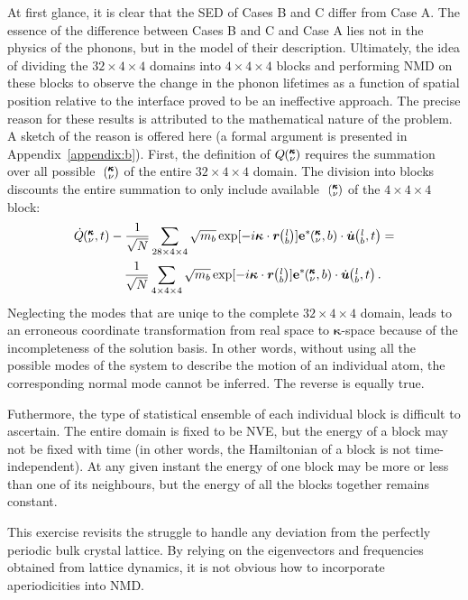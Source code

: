 At first glance, it is clear that the SED of Cases B and C differ from Case A. The essence of the difference between Cases B and C and Case A lies not in the physics of the phonons, but in the model of their description. Ultimately, the idea of dividing the $32\times4\times4$ domains into $4\times4\times4$ blocks and performing NMD on these blocks to observe the change in the phonon lifetimes as a function of spatial position relative to the interface proved to be an ineffective approach.
The precise reason for these results is attributed to the mathematical nature of the problem. A sketch of the reason is offered here (a formal argument is presented in Appendix~\ref{appendix:b}). First, the definition of $Q \mspace{-4.0mu}\left(\mspace{-8.0mu} \begin{smallmatrix}&\pmb{\kappa} \\&\nu\end{smallmatrix} \mspace{-3.0mu}\right) $ requires the summation over all possible ~$\mspace{-4.0mu}\left(\mspace{-8.0mu} \begin{smallmatrix}&\pmb{\kappa} \\&\nu\end{smallmatrix} \mspace{-3.0mu}\right)$ of the entire $32\times4\times4$ domain. The division into blocks discounts the entire summation to only include available ~$\mspace{-4.0mu}\left(\mspace{-8.0mu} \begin{smallmatrix}&\pmb{\kappa} \\&\nu\end{smallmatrix} \mspace{-3.0mu}\right)$ of the $4\times4\times4$ block:
\begin{eqnarray}
\begin{split}
\dot{Q}\kvt-\frac{1}{\sqrt{N}}\sum_{28\times4\times4}\sqrt{m_b}\exp[-i\bm{\kappa}\cdot\bm{r}\lb]\bm{\mathrm{e}}^*\kvb\cdot\dot{\bm{u}}\lbt&=\\\frac{1}{\sqrt{N}}\sum_{4\times4\times4}\sqrt{m_b}\exp[-i\bm{\kappa}\cdot\bm{r}\lb ]\bm{\mathrm{e}}^*\kvb\cdot\dot{\bm{u}}\lbt.
\end{split}
\end{eqnarray}
Neglecting the modes that are uniqe to the complete $32\times4\times4$ domain, leads to an erroneous coordinate transformation from real space to $\pmb{\kappa}$-space because of the incompleteness of the solution basis. In other words, without using all the possible modes of the system to describe the motion of an individual atom, the corresponding normal mode cannot be inferred. The reverse is equally true.

Futhermore, the type of statistical ensemble of each individual block is difficult to ascertain. The entire domain is fixed to be NVE, but the energy of a block may not be fixed with time (in other words, the Hamiltonian of a block is not time-independent). At any given instant the energy of one block may be more or less than one of its neighbours, but the energy of all the blocks together remains constant.

This exercise revisits the struggle to handle any deviation from the perfectly periodic bulk crystal lattice. By relying on the eigenvectors and frequencies obtained from lattice dynamics, it is not obvious how to incorporate aperiodicities into NMD.


